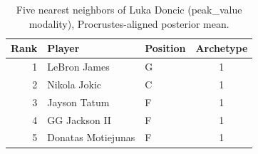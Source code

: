\begin{table}[htbp]
  \centering\small
  \begin{tabular}{rllc}
    \toprule
    Rank & Player & Position & Archetype \\
    \midrule
    1 & LeBron James & G & 1 \\
    2 & Nikola Jokic & C & 1 \\
    3 & Jayson Tatum & F & 1 \\
    4 & GG Jackson II & F & 1 \\
    5 & Donatas Motiejunas & F & 1 \\
    \bottomrule
  \end{tabular}
  \caption{Five nearest neighbors of Luka Doncic (peak_value modality), Procrustes-aligned posterior mean.}
  \label{tab:Luka_Doncic_neighbors_peak_value}
\end{table}

